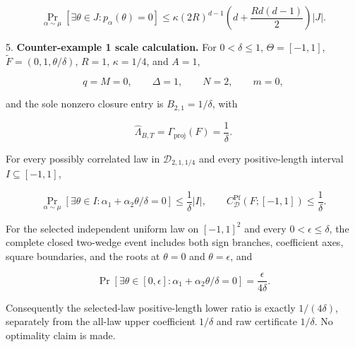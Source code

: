 \begin{proposition}
\begin{equation}
\label{eq:appendix-indented-055}
   \Pr_{\alpha\sim\mu}[\exists\theta\in J:p_\alpha(\theta)=0]
   \leq
   \kappa(2R)^{d-1}
   \left(d+\frac{Rd(d-1)}2\right)\lvert J\rvert.
\end{equation}

5. \textbf{Counter-example 1 scale calculation.} For \(0<\delta\leq1\),
   \(\Theta=[-1,1]\), \(\widetilde F=(0,1,\theta/\delta)\), \(R=1\), \(\kappa=1/4\), and \(A=1\),
   
\begin{equation}
\label{eq:appendix-indented-056}
   q=M=0,
   \qquad \Delta=1,
   \qquad N=2,
   \qquad m=0,
\end{equation}
   
   and the sole nonzero closure entry is \(B_{2,1}=1/\delta\), with
   
\begin{equation}
\label{eq:appendix-indented-057}
   \widehat\Lambda_{B,T}
   =\Gamma_{\mathrm{proj}}(F)
   =\frac1\delta.
\end{equation}
   
   For every possibly correlated law in \(\mathcal D_{2,1,1/4}\) and every positive-length interval
   \(I\subseteq[-1,1]\),
   
\begin{equation}
\label{eq:appendix-indented-058}
   \Pr_{\alpha\sim\mu}[\exists\theta\in I:
   \alpha_1+\alpha_2\theta/\delta=0]
   \leq\frac1\delta\lvert I\rvert,
   \qquad
   C^{\mathrm{Pf}}_{\mathcal D}(F;[-1,1])\leq\frac1\delta.
\end{equation}
   
   For the selected independent uniform law on \([-1,1]^2\) and every
   \(0<\epsilon\leq\delta\), the complete closed two-wedge event includes both sign branches, coefficient
   axes, square boundaries, and the roots at \(\theta=0\) and \(\theta=\epsilon\), and
   
\begin{equation}
\label{eq:appendix-indented-059}
   \Pr[\exists\theta\in[0,\epsilon]:
   \alpha_1+\alpha_2\theta/\delta=0]
   =\frac{\epsilon}{4\delta}.
\end{equation}
   
   Consequently the selected-law positive-length lower ratio is exactly \(1/(4\delta)\), separately from the
   all-law upper coefficient \(1/\delta\) and raw certificate \(1/\delta\). No optimality claim is made.


\end{proposition}
